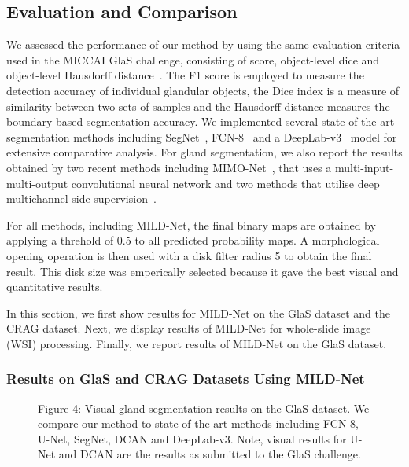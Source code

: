 \documentclass[3p]{elsarticle}
\begin{document}
\subsection{Evaluation and Comparison}
We assessed the performance of our method by using the same evaluation criteria used in the MICCAI GlaS challenge, consisting of  score, object-level dice and object-level Hausdorff distance~\citep{sirinukunwattana2017gland}. The F1 score is employed to measure the detection accuracy of individual glandular objects, the Dice index is a measure of similarity between two sets of samples and the Hausdorff distance measures the boundary-based segmentation accuracy. We implemented several state-of-the-art segmentation methods including SegNet~\citep{badrinarayanan2015segnet}, FCN-8~\citep{long2015fully} and a DeepLab-v3~\citep{chen2018deeplab} model for extensive comparative analysis. For gland segmentation, we also report the results obtained by two recent methods including MIMO-Net~\citep{raza2017mimonet}, that uses a multi-input-multi-output convolutional neural network and two methods that utilise deep multichannel side supervision~\citep{xu2016gland,xu2017gland}.

For all methods, including MILD-Net, the final binary maps are obtained by applying a threhold of 0.5 to all predicted probability maps. A morphological opening operation is then used with a disk filter radius 5 to obtain the final result. This disk size was emperically selected because it gave the best visual and quantitative results. 

In this section, we first show results for MILD-Net on the GlaS dataset and the CRAG dataset. Next, we display results of MILD-Net for whole-slide image (WSI) processing. Finally, we report results of MILD-Net on the GlaS dataset. 

\subsubsection{Results on GlaS and CRAG Datasets Using MILD-Net}
\begin{figure}[!t]
\centering
\captionsetup[subfigure]{labelformat=empty}
\caption*{Figure 4: Visual gland segmentation results on the GlaS dataset. We compare our method to state-of-the-art methods including FCN-8, U-Net, SegNet, DCAN and DeepLab-v3. Note, visual results for U-Net and DCAN are the results as submitted to the GlaS challenge.}
\end{figure}
\end{document}
